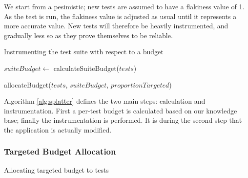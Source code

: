 {We start from a pesimistic; new tests are assumed to have a flakiness value of
1. As the test is run, the flakiness value is adjusted as usual until it
represents a more accurate value. New tests will therefore be heavily
instrumented, and gradually less so as they prove themselves to be reliable.

\begin{algorithm}[h]
\caption{Instrumenting the test suite with respect to a budget}
\label{alg:splatter}

\begin{algorithmic}
	\Statex


	\State $suiteBudget \gets$ calculateSuiteBudget($tests$)
	\Statex

	\State allocateBudget($tests$, $suiteBudget$, $proportionTargeted$)
	\Statex

	\EndFor

	\EndFunction

	\Statex


	\Statex


	\EndFunction
\end{algorithmic}

\end{algorithm}

Algorithm \ref{alg:splatter} defines the two main steps: calculation and
instrumentation. First a per-test budget is calculated based on our knowledge
base; finally the instrumentation is performed. It is during the second step
that the application is actually modified.

\subsubsection{Targeted Budget Allocation}
\label{sec:sec:targeted_budget_alloc}

\begin{algorithm}[H]
\caption{Allocating targeted budget to tests}
\label{alg:allocateTargetedBudget}


\end{algorithm}}
